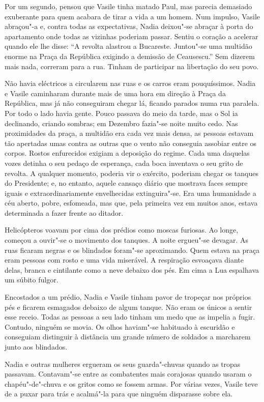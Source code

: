 Por um segundo, pensou que Vasile tinha matado Paul, mas parecia
demasiado exuberante para quem acabara de tirar a vida a um homem. Num
impulso, Vasile abraçou"-a e, contra todas as expectativas, Nadia
deixou"-se abraçar à porta do apartamento onde todas as vizinhas poderiam
passar. Sentiu o coração a acelerar quando ele lhe disse:
``A revolta alastrou a Bucareste. Juntou"-se uma multidão enorme na Praça
da República exigindo a demissão de
Ceausescu.'' Sem dizerem mais nada, correram para a rua. Tinham de
participar na libertação do seu povo.

Não havia eléctricos a circularem nas ruas e os carros eram
pouquíssimos. Nadia e Vasile caminharam durante mais de uma hora em
direção à Praça da República, mas já não conseguiram chegar lá, ficando
parados numa rua paralela. Por todo o lado havia gente. Pouco passava do
meio da tarde, mas o Sol ia declinando, criando sombras; em Dezembro
fazia"-se noite muito cedo. Nas proximidades da praça, a multidão era
cada vez mais densa, as pessoas estavam tão apertadas umas contra as
outras que o vento não conseguia assobiar entre os corpos. Rostos
enfurecidos exigiam a deposição do regime. Cada uma daquelas vozes
detinha o seu pedaço de esperança, cada boca inventava o seu grito de
revolta. A qualquer momento, poderia vir o exército, poderiam chegar
os tanques do Presidente; e, no entanto, aquele cansaço diário que
mostrava faces sempre iguais e extraordinariamente envelhecidas
extinguira"-se. Era uma humanidade a céu aberto, pobre, esfomeada, mas
que, pela primeira vez em muitos anos, estava determinada a fazer frente
ao ditador.

Helicópteros voavam por cima dos prédios como moscas furiosas. Ao longe, começou a ouvir"-se o movimento dos tanques. A
noite ergueu"-se devagar. As ruas ficaram negras e os blindados foram"-se
aproximando. Quem estava na praça eram pessoas com rosto e uma vida
miserável. A respiração esvoaçava diante delas, branca e cintilante como
a neve debaixo dos pés. Em cima a Lua espalhava um súbito fulgor.


Encostados a um prédio, Nadia e Vasile tinham pavor de tropeçar nos
próprios pés e ficarem esmagados debaixo de algum tanque. Não eram os
únicos a sentir esse receio. Todas as pessoas a seu lado tinham um medo
que as impelia a fugir. Contudo, ninguém se movia. Os olhos haviam"-se
habituado à escuridão e conseguiam distinguir à distância um grande
número de soldados a marcharem junto aos blindados.

Nadia e outras mulheres ergueram os seus guarda"-chuvas quando as tropas passavam. Contavam"-se entre as combatentes mais
corajosas quando usaram o chapéu"-de"-chuva e os gritos como se fossem armas. Por várias vezes, Vasile teve
de a puxar para trás e acalmá"-la para que ninguém disparasse sobre
ela.


